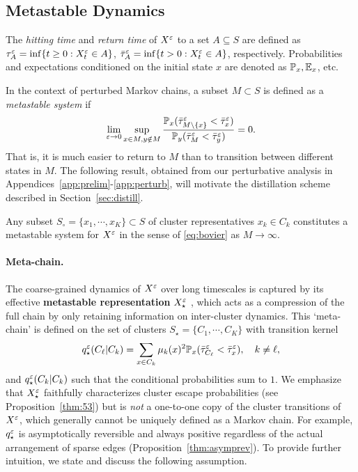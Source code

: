 \subsection{Metastable Dynamics}

The \textit{hitting time} and \textit{return time} of $X^\varepsilon$ to a set $A\subseteq S$ are defined as $\tau_A^\varepsilon=\inf\{t\ge 0: X_t^\varepsilon\in A\}$, $\bar{\tau}_A^\varepsilon=\inf\{t> 0: X_t^\varepsilon\in A\}$, respectively. Probabilities and expectations conditioned on the initial state $x$ are denoted as $\mathbb{P}_x,\mathbb{E}_x$, etc.

In the context of perturbed Markov chains, a subset $M\subset S$ is defined as a \emph{metastable system} \citep{Bovier02} if
\begin{equation}\label{eq:bovier}
\lim_{\varepsilon\to 0} \sup_{x\in M,y\notin M} \frac{\mathbb{P}_x(\bar{\tau}_{M\setminus\{x\}}^\varepsilon < \bar{\tau}_x^\varepsilon)}{\mathbb{P}_y(\bar{\tau}_M^\varepsilon < \bar{\tau}_y^\varepsilon)} = 0.
\end{equation}
That is, it is much easier to return to $M$ than to transition between different states in $M$. The following result, obtained from our perturbative analysis in Appendices~\ref{app:prelim}-\ref{app:perturb}, will motivate the distillation scheme described in Section~\ref{sec:distill}.

\begin{prop}\label{thm:bovier}
Any subset $S_\circ=\{x_1,\cdots,x_K\}\subset S$ of cluster representatives $x_k\in C_k$ constitutes a metastable system for $X^\varepsilon$ in the sense of \eqref{eq:bovier} as $M\to\infty$.
\end{prop}

\paragraph{Meta-chain.} The coarse-grained dynamics of $X^\varepsilon$ over long timescales is captured by its effective \textbf{metastable representation} $X_\star^\varepsilon$ \citep{Wicks05,Betz16}, which acts as a compression of the full chain by only retaining information on inter-cluster dynamics. This `meta-chain' is defined on the set of clusters $S_\star = \{C_1,\cdots,C_K\}$ with transition kernel
\begin{equation}\label{eq:meta}
q_\star^\varepsilon(C_\ell|C_k) = \sum_{x\in C_k} \mu_k(x)^2 \mathbb{P}_x(\bar{\tau}_{C_\ell}^\varepsilon < \bar{\tau}_x^\varepsilon), \quad k\neq\ell,
\end{equation}
and $q_\star^\varepsilon(C_k|C_k)$ such that the conditional probabilities sum to $1$. We emphasize that $X_\star^\varepsilon$ faithfully characterizes cluster escape probabilities (see Proposition~\ref{thm:53}) but is \emph{not} a one-to-one copy of the cluster transitions of $X^\varepsilon$, which generally cannot be uniquely defined as a Markov chain. For example, $q_\star^\varepsilon$ is asymptotically reversible and always positive regardless of the actual arrangement of sparse edges (Proposition~\ref{thm:asymprev}). To provide further intuition, we state and discuss the following assumption.

